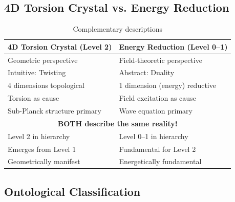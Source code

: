	\subsection{4D Torsion Crystal vs. Energy Reduction}
	
	\begin{table}[H]
		\centering
		\small
		\begin{tabular}{p{5cm}|p{5cm}}
			\toprule
			\textbf{4D Torsion Crystal (Level 2)} & \textbf{Energy Reduction (Level 0--1)} \\
			\midrule
			Geometric perspective & Field-theoretic perspective \\
			Intuitive: Twisting & Abstract: Duality \\
			4 dimensions topological & 1 dimension (energy) reductive \\
			Torsion as cause & Field excitation as cause \\
			Sub-Planck structure primary & Wave equation primary \\
			\midrule
			\multicolumn{2}{c}{\textbf{BOTH describe the same reality!}} \\
			\midrule
			Level 2 in hierarchy & Level 0--1 in hierarchy \\
			Emerges from Level 1 & Fundamental for Level 2 \\
			Geometrically manifest & Energetically fundamental \\
			\bottomrule
		\end{tabular}
		\caption{Complementary descriptions}
	\end{table}
	
	\subsection{Ontological Classification}
	
